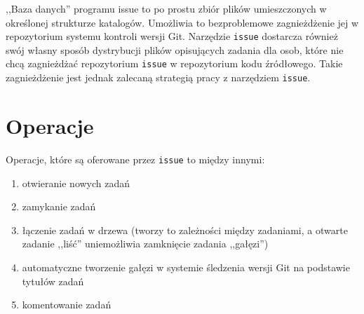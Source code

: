 ,,Baza danych'' programu issue to po prostu zbiór plików umieszczonych w
określonej strukturze katalogów. Umożliwia to bezproblemowe zagnieżdżenie jej
w repozytorium systemu kontroli wersji Git. Narzędzie \texttt{issue} dostarcza
również swój własny sposób dystrybucji plików opisujących zadania dla osob,
które nie chcą zagnieżdżać repozytorium \texttt{issue} w repozytorium kodu
źródłowego. Takie zagnieżdżenie jest jednak zalecaną strategią pracy z
narzędziem \texttt{issue}.

\section{Operacje}

Operacje, które są oferowane przez \texttt{issue} to między innymi:

\begin{enumerate}
\item otwieranie nowych zadań
\item zamykanie zadań
\item łączenie zadań w drzewa (tworzy to zależności między zadaniami, a otwarte
    zadanie ,,liść'' uniemożliwia zamknięcie zadania ,,gałęzi'')
\item automatyczne tworzenie gałęzi w systemie śledzenia wersji Git na podstawie
    tytułów zadań
\item komentowanie zadań
\end{enumerate}

